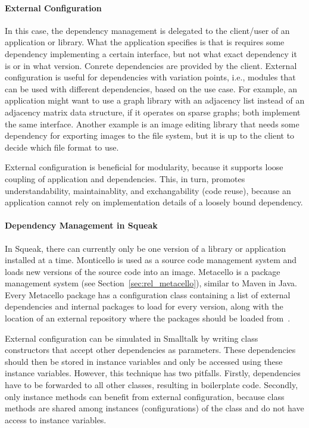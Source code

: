 \paragraph{External Configuration}
In this case, the dependency management is delegated to the client/user of an application or library. What the application specifies is that is requires some dependency implementing a certain interface, but not what exact dependency it is or in what version. Conrete dependencies are provided by the client. External configuration is useful for dependencies with variation points, i.e., modules that can be used with different dependencies, based on the use case. For example, an application might want to use a graph library with an adjacency list instead of an adjacency matrix data structure, if it operates on sparse graphs; both implement the same interface. Another example is an image editing library that needs some dependency for exporting images to the file system, but it is up to the client to decide which file format to use. 

External configuration is beneficial for modularity, because it supports loose coupling of application and dependencies. This, in turn, promotes understandability, maintainablity, and exchangability (code reuse), because an application cannot rely on implementation details of a loosely bound dependency.

\paragraph{Dependency Management in Squeak}
In Squeak, there can currently only be one version of a library or application installed at a time. Monticello is used as a source code management system and loads new versions of the source code into an image. Metacello is a package management system (see Section~\ref{sec:rel_metacello}), similar to Maven in Java. Every Metacello package has a configuration class containing a list of external dependencies and internal packages to load for every version, along with the location of an external repository where the packages should be loaded from~\cite{metacellodraft}.

External configuration can be simulated in Smalltalk by writing class constructors that accept other dependencies as parameters. These dependencies should then be stored in instance variables and only be accessed using these instance variables. However, this technique has two pitfalls. Firstly, dependencies have to be forwarded to all other classes, resulting in boilerplate code. Secondly, only instance methods can benefit from external configuration, because class methods are shared among instances (configurations) of the class and do not have access to instance variables.

